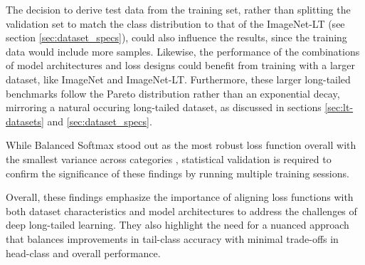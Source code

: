The decision to derive test data from the training set, rather than splitting the validation set to match the class distribution to that of the ImageNet-LT (see section \ref{sec:dataset_specs}), could also influence the results, since the training data would include more samples. Likewise, the performance of the combinations of model architectures and loss designs could benefit from training with a larger dataset, like ImageNet and ImageNet-LT. Furthermore, these larger long-tailed benchmarks follow the Pareto distribution rather than an exponential decay, mirroring a natural occuring long-tailed dataset, as discussed in sections \ref{sec:lt-datasets} and \ref{sec:dataset_specs}.  

While Balanced Softmax stood out as the most robust loss function overall with the smallest variance across categories , statistical validation is required to confirm the significance of these findings by running multiple training sessions.

Overall, these findings emphasize the importance of aligning loss functions with both dataset characteristics and model architectures to address the challenges of deep long-tailed learning. They also highlight the need for a nuanced approach that balances improvements in tail-class accuracy with minimal trade-offs in head-class and overall performance.

